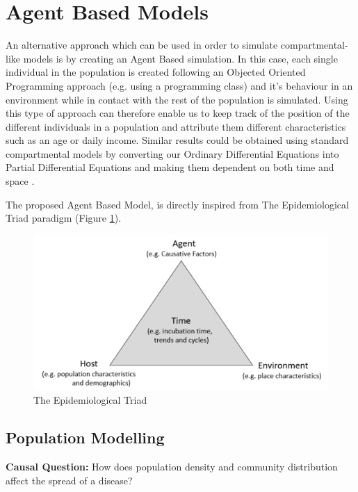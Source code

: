 \section{Agent Based Models}
\label{agent_smith}
An alternative approach which can be used in order to simulate compartmental-like models is by creating an Agent Based simulation. In this case, each single individual in the population is created following an Objected Oriented Programming approach (e.g. using a programming class) and it's behaviour in an environment while in contact with the rest of the population is simulated. Using this type of approach can therefore enable us to keep track of the position of the different individuals in a population and attribute them different characteristics such as an age or daily income. Similar results could be obtained using standard compartmental models by converting our Ordinary Differential Equations into Partial Differential Equations and making them dependent on both time and space \cite{pde}.

The proposed Agent Based Model, is directly inspired from The Epidemiological Triad paradigm (Figure \ref{triad}).

\begin{figure}[h]
\vspace{-0.2cm}
\centering
\includegraphics[scale = 0.5]{latex/images/model.pdf}
\caption{The Epidemiological Triad}
\label{triad}
\end{figure}

\subsection{Population Modelling}

\textbf{Causal Question:} How does population density and community distribution affect the spread of a disease?

